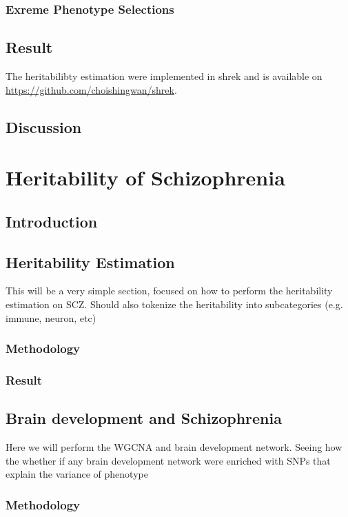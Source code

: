 \documentclass{book}
\begin{document}
		\subsection{Exreme Phenotype Selections}
	\section{Result}
		The heritabilibty estimation were implemented in \gls{shrek} and is available on \url{https://github.com/choishingwan/shrek}.
		
	\section{Discussion}
	
	\chapter{Heritability of Schizophrenia}
	\section{Introduction}
	\section{Heritability Estimation}
	This will be a very simple section, focused on how to perform the heritability estimation on \acrfull{SCZ}.
	Should also tokenize the heritability into subcategories (e.g. immune, neuron, etc)
	\subsection{Methodology}
	\subsection{Result}
	\section{Brain development and Schizophrenia}
	Here we will perform the WGCNA and brain development network.
	Seeing how the whether if any brain development network were enriched with SNPs that explain the variance of phenotype
	\subsection{Methodology}
\end{document}
